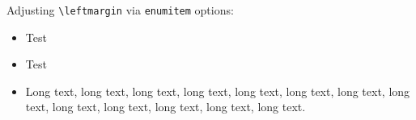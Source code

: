 \documentclass{res}
\begin{document}
Adjusting \verb+\leftmargin+ via \verb+enumitem+ options:
\begin{itemize}[leftmargin=-.5in]
\item Test
\item Test
\item Long text, long text, long text, long text, long text, long
  text, long text, long text, long text, long text, long text, long
  text, long text.
\end{itemize}
\end{document}
